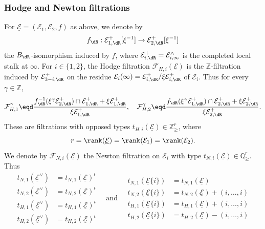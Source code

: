 \subsubsection{Hodge and Newton filtrations}\label{subsec:Hodge-and-NewtonForModif}

For $\underline{\mathcal{E}}=(\mathcal{E}_{1},\mathcal{E}_{2},f)$ as above, we denote by
\[
f_{\dR}:\mathcal{E}_{1,\dR}^{+}[\xi^{-1}]\rightarrow\mathcal{E}_{2,\dR}^{+}[\xi^{-1}]
\]
the $B_{\dR}$-isomorphism induced by $f$, where $\mathcal{E}_{i,\dR}^{+}=\mathcal{E}_{i,\infty}^{\wedge}$ is the completed local stalk at $\infty$. For $i\in\{1,2\}$, the Hodge filtration $\mathcal{F}_{H,i}(\underline{\mathcal{E}})$ is the $\mathbb{Z}$-filtration induced by $\mathcal{E}_{3-i,\dR}^{+}$ on the residue $\mathcal{E}_{i}(\infty)=\mathcal{E}_{i,\dR}^{+}/\xi\mathcal{E}_{i,\dR}^{+}$ of $\mathcal{E}_{i}$. Thus for every $\gamma\in\mathbb{Z}$,
\[
\mathcal{F}_{H,1}^{\gamma}\eqd\frac{f_{\dR}^{-1}(\xi^{\gamma}\mathcal{E}_{2,\dR}^{+})\cap\mathcal{E}_{1,\dR}^{+}+\xi\mathcal{E}_{1,\dR}^{+}}{\xi\mathcal{E}_{1,\dR}^{+}},\quad\mathcal{F}_{H,2}^{\gamma}\eqd\frac{f_{\dR}(\xi^{\gamma}\mathcal{E}_{1,\dR}^{+})\cap\mathcal{E}_{2,\dR}^{+}+\xi\mathcal{E}_{2,\dR}^{+}}{\xi\mathcal{E}_{2,\dR}^{+}}.
\]
These are filtrations with opposed types $t_{H,i}(\underline{\mathcal{E}})\in\mathbb{\mathbb{Z}}_{\geq}^{r}$, where
\[
r=\rank(\underline{\mathcal{E}})=\rank(\mathcal{E}_{1})=\rank(\mathcal{E}_{2}).
\]
We denote by $\mathcal{F}_{N,i}(\underline{\mathcal{E}})$ the Newton filtration on $\mathcal{E}_{i}$ with type $t_{N,i}(\mathcal{\underline{E}})\in\mathbb{Q}_{\geq}^{r}$. Thus
\[
\begin{aligned}
t_{N,1}\left(\underline{\mathcal{E}}^{\vee}\right) & = t_{N,1}\left(\underline{\mathcal{E}}\right)^{\iota}\\
t_{N,2}\left(\underline{\mathcal{E}}^{\vee}\right) & = t_{N,2}\left(\underline{\mathcal{E}}\right)^{\iota}\\
t_{H,1}\left(\underline{\mathcal{E}}^{\vee}\right) & = t_{H,1}\left(\underline{\mathcal{E}}\right)^{\iota}\\
t_{H,2}\left(\underline{\mathcal{E}}^{\vee}\right) & = t_{H,2}\left(\underline{\mathcal{E}}\right)^{\iota}
\end{aligned}\quad\text{and}\quad
\begin{aligned}
t_{N,1}\left(\underline{\mathcal{E}}\{i\}\right) & = t_{N,1}\left(\underline{\mathcal{E}}\right)\\
t_{N,2}\left(\underline{\mathcal{E}}\{i\}\right) & = t_{N,2}\left(\underline{\mathcal{E}}\right)+(i,\dots,i)\\
t_{H,1}\left(\underline{\mathcal{E}}\{i\}\right) & = t_{H,1}\left(\underline{\mathcal{E}}\right)+(i,\dots,i)\\
t_{H,2}\left(\underline{\mathcal{E}}\{i\}\right) & = t_{H,2}\left(\underline{\mathcal{E}}\right)-(i,\dots,i)
\end{aligned}
\]
